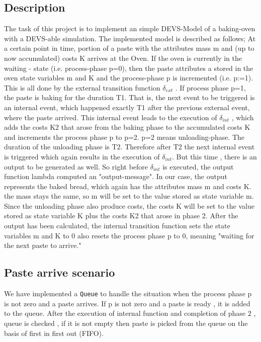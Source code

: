 \documentclass[titlepage]{article}%
\begin{document}
\subsection{Description}

The task of this project is to implement an simple DEVS-Model of a baking-oven with a DEVS-able simulation. The implemented model is described as follows;
At a certain point in time, portion of a paste with the attributes mass m and (up to now accumulated) costs K arrives at the Oven. If the oven is currently in the waiting - state (i.e. process-phase p=0), then the paste attributes a stored in the oven state variables m and K and the process-phase p is incremented (i.e. p:=1). This is all done by the external transition function $\delta_{ext}$ . If process phase p=1, the paste is baking for the duration T1. That is, the next event to be triggered is an internal event, which happened exactly T1 after the previous external event, where the paste arrived. This internal event leads to the execution of  $\delta_{int}$ , which adds the costs K2 that arose from the baking phase to the accumulated costs K and increments the process phase p to p=2. p=2 means unloading-phase. The duration of the unloading phase is T2. Therefore after T2 the next internal event is triggered which again results in the execution of $\delta_{int}$. But this time , there is an output to be generated as well. So right before $\delta_{int}$ is executed, the output function lambda computed an "output-message". In our case, the output represents the baked bread, which again has the attributes mass m and costs K. the mass stays the same, so m will be set to the value stored as state variable m. Since the unloading phase also produce costs, the costs K will be set to the value stored as state variable K plus the costs K2 that arose in phase 2. After the output has been calculated, the internal transition function sets the state variables m and K to 0 also resets the process phase p to 0, meaning "waiting for the next paste to arrive." 

\subsection{Paste arrive scenario}
We have implemented a \texttt{Queue} to handle the situation when the process phase p is not zero and a paste arrives. If p is not zero and a paste is ready , it is added to the queue. After the execution of internal function and completion of phase 2 , queue is checked , if it is not empty then paste is picked from the queue on the basis of first in first out (FIFO). 
\end{document}

